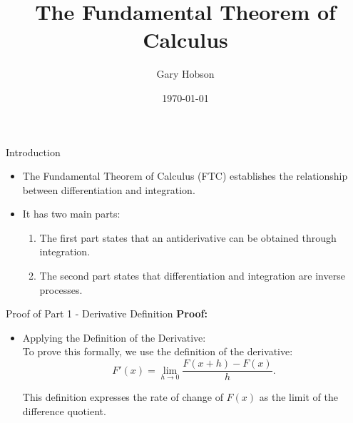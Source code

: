 \documentclass{beamer}
\title{The Fundamental Theorem of Calculus}
\author{Gary Hobson}
\date{\today}
\begin{document}
\frame{\titlepage}


\begin{frame}{Introduction}
\begin{itemize}
    \item The Fundamental Theorem of Calculus (FTC) establishes the relationship between differentiation and integration.
    \item It has two main parts:
    \begin{enumerate}
        \item The first part states that an antiderivative can be obtained through integration.
        \item The second part states that differentiation and integration are inverse processes.
    \end{enumerate}
\end{itemize}
\end{frame}


\begin{frame}{Proof of Part 1 - Derivative Definition}
\textbf{\normalsize Proof:}

\begin{itemize}
    \item Applying the Definition of the Derivative:\\
    To prove this formally, we use the definition of the derivative:
    \[
    F'(x) = \lim\limits_{h \to 0} \frac{F(x+h) - F(x)}{h}.
    \]

    This definition expresses the rate of change of \( F(x) \) as the limit of the difference quotient.
\end{itemize}
\end{frame}

\end{document}
